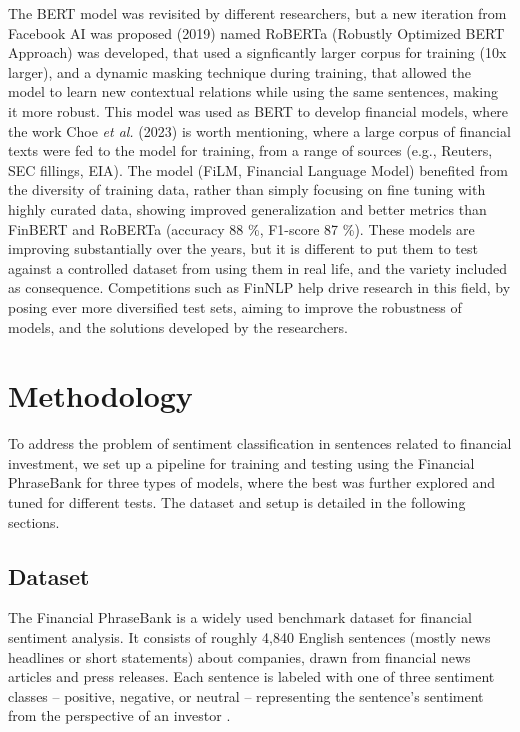 \documentclass[conference]{IEEEtran}
\begin{document}
The BERT model was revisited by different researchers, but a new iteration from Facebook AI was proposed (2019) named RoBERTa (Robustly Optimized BERT Approach) was developed, that used a signficantly larger corpus for training (10x larger), and a dynamic masking technique during training, that allowed the model to learn new contextual relations while using the same sentences, making it more robust. This model was used as BERT to develop financial models, where the work Choe \textit{et al.} (2023) is worth mentioning, where a large corpus of financial texts were fed to the model for training, from a range of sources (e.g., Reuters, SEC fillings, EIA). The model (FiLM, Financial Language Model) benefited from the diversity of training data, rather than simply focusing on fine tuning with highly curated data, showing improved generalization and better metrics than FinBERT and RoBERTa (accuracy 88 \%, F1-score 87 \%). These models are improving substantially over the years, but it is different to put them to test against a controlled dataset from using them in real life, and the variety included as consequence. Competitions such as FinNLP help drive research in this field, by posing ever more diversified test sets, aiming to improve the robustness of models, and the solutions developed by the researchers.


\section{Methodology}

To address the problem of sentiment classification in sentences related to financial investment, we set up a pipeline for training and testing using the Financial PhraseBank for three types of models, where the best was further explored and tuned for different tests. The dataset and setup is detailed in the following sections.

\subsection{Dataset}

The Financial PhraseBank is a widely used benchmark dataset for financial sentiment analysis. It consists of roughly 4,840 English sentences (mostly news headlines or short statements) about companies, drawn from financial news articles and press releases. Each sentence is labeled with one of three sentiment classes – positive, negative, or neutral – representing the sentence’s sentiment from the perspective of an investor \cite{dataset, malo2013gooddebtbaddebt}.
\end{document}
